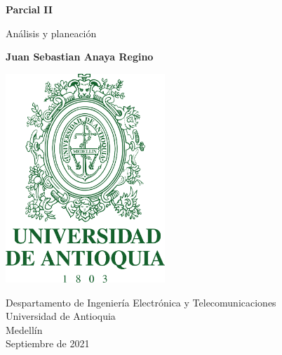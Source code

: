 \documentclass{article}
\begin{document}
\begin{titlepage}
    \begin{center}
        \vspace*{1cm}
            
        \Huge
        \textbf{Parcial II}
            
        \vspace{0.5cm}
        \LARGE
        Análisis y planeación
            
        \vspace{1.5cm}
            
        \textbf{Juan Sebastian Anaya Regino}
            
        \vspace{0.9cm}
        \centering
        \includegraphics[width=6cm]{images/logo.png}
            
        \vfill
            
        \vspace{0.8cm}
            
        \Large
        Despartamento de Ingeniería Electrónica y Telecomunicaciones\\
        Universidad de Antioquia\\
        Medellín\\
        Septiembre de 2021
            
    \end{center}
\end{titlepage}
\end{document}
